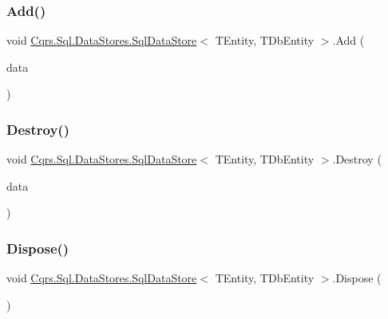 \subsubsection{\texorpdfstring{Add()}{Add()}\hspace{0.1cm}{\footnotesize\ttfamily [2/2]}}
{\footnotesize\ttfamily void \hyperlink{classCqrs_1_1Sql_1_1DataStores_1_1SqlDataStore}{Cqrs.\+Sql.\+Data\+Stores.\+Sql\+Data\+Store}$<$ T\+Entity, T\+Db\+Entity $>$.Add (\begin{DoxyParamCaption}\item[{I\+Enumerable$<$ T\+Entity $>$}]{data }\end{DoxyParamCaption})}

\mbox{\label{classCqrs_1_1Sql_1_1DataStores_1_1SqlDataStore_a5065ed1d4b5c66324afcde4acc68ad6b}} 
\subsubsection{\texorpdfstring{Destroy()}{Destroy()}}
{\footnotesize\ttfamily void \hyperlink{classCqrs_1_1Sql_1_1DataStores_1_1SqlDataStore}{Cqrs.\+Sql.\+Data\+Stores.\+Sql\+Data\+Store}$<$ T\+Entity, T\+Db\+Entity $>$.Destroy (\begin{DoxyParamCaption}\item[{T\+Entity}]{data }\end{DoxyParamCaption})}

\mbox{\label{classCqrs_1_1Sql_1_1DataStores_1_1SqlDataStore_ac142d009f768519891ca12185a2e6191}} 
\subsubsection{\texorpdfstring{Dispose()}{Dispose()}}
{\footnotesize\ttfamily void \hyperlink{classCqrs_1_1Sql_1_1DataStores_1_1SqlDataStore}{Cqrs.\+Sql.\+Data\+Stores.\+Sql\+Data\+Store}$<$ T\+Entity, T\+Db\+Entity $>$.Dispose (\begin{DoxyParamCaption}{ }\end{DoxyParamCaption})}



